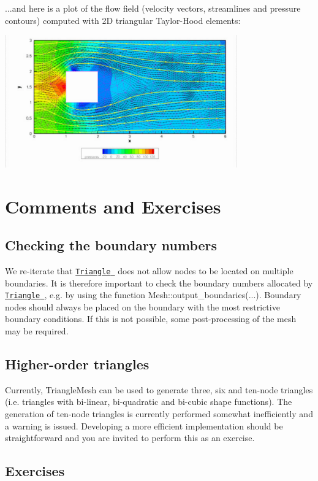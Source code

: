 ...and here is a plot of the flow field (velocity vectors, streamlines and pressure contours) computed with 2D triangular Taylor-\/\+Hood elements\+:

 
\begin{DoxyImage}
\includegraphics[width=0.75\textwidth]{box_flow}
\end{DoxyImage}




 

\hypertarget{index_comments}{}\section{Comments and Exercises}\label{index_comments}
\hypertarget{index_check}{}\subsection{Checking the boundary numbers}\label{index_check}
We re-\/iterate that \href{http://www.cs.cmu.edu/~quake/triangle.html}{\tt {\ttfamily Triangle} } does not allow nodes to be located on multiple boundaries. It is therefore important to check the boundary numbers allocated by \href{http://www.cs.cmu.edu/~quake/triangle.html}{\tt {\ttfamily Triangle} }, e.\+g. by using the function {\ttfamily Mesh\+::output\+\_\+boundaries}(...). Boundary nodes should always be placed on the boundary with the most restrictive boundary conditions. If this is not possible, some post-\/processing of the mesh may be required.\hypertarget{index_elements}{}\subsection{Higher-\/order triangles}\label{index_elements}
Currently, {\ttfamily Triangle\+Mesh} can be used to generate three, six and ten-\/node triangles (i.\+e. triangles with bi-\/linear, bi-\/quadratic and bi-\/cubic shape functions). The generation of ten-\/node triangles is currently performed somewhat inefficiently and a warning is issued. Developing a more efficient implementation should be straightforward and you are invited to perform this as an exercise.\hypertarget{index_ex}{}\subsection{Exercises}\label{index_ex}

